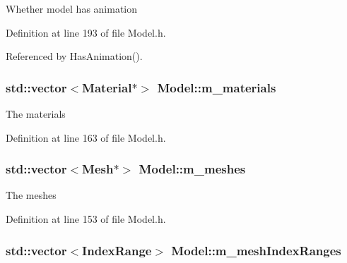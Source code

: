 Whether model has animation 



Definition at line 193 of file Model.\+h.



Referenced by Has\+Animation().

\subsubsection[{\texorpdfstring{m\+\_\+materials}{m_materials}}]{\setlength{\rightskip}{0pt plus 5cm}std\+::vector$<${\bf Material}$\ast$$>$ Model\+::m\+\_\+materials\hspace{0.3cm}{\ttfamily [private]}}\hypertarget{class_model_a17953e88c3232c1d1e4394f7412eb8ef}{}\label{class_model_a17953e88c3232c1d1e4394f7412eb8ef}


The materials 



Definition at line 163 of file Model.\+h.

\subsubsection[{\texorpdfstring{m\+\_\+meshes}{m_meshes}}]{\setlength{\rightskip}{0pt plus 5cm}std\+::vector$<${\bf Mesh}$\ast$$>$ Model\+::m\+\_\+meshes\hspace{0.3cm}{\ttfamily [private]}}\hypertarget{class_model_a2f3d6af54716219364db7bc87e231e3b}{}\label{class_model_a2f3d6af54716219364db7bc87e231e3b}


The meshes 



Definition at line 153 of file Model.\+h.

\subsubsection[{\texorpdfstring{m\+\_\+mesh\+Index\+Ranges}{m_meshIndexRanges}}]{\setlength{\rightskip}{0pt plus 5cm}std\+::vector$<${\bf Index\+Range}$>$ Model\+::m\+\_\+mesh\+Index\+Ranges\hspace{0.3cm}{\ttfamily [private]}}\hypertarget{class_model_a1f36d8e62aa0375e25255f6e0f8bc5c5}{}\label{class_model_a1f36d8e62aa0375e25255f6e0f8bc5c5}


